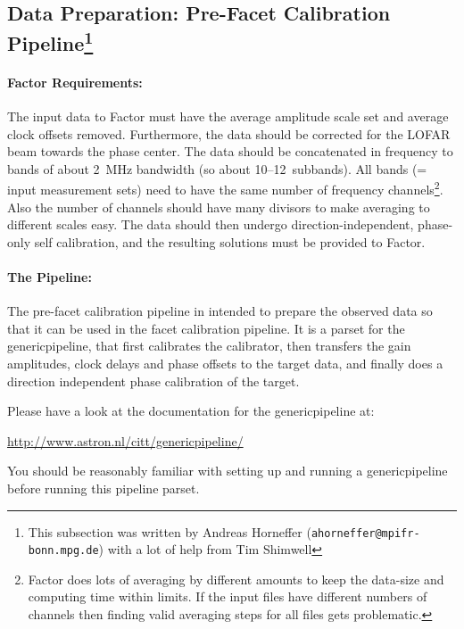 \subsection[Data Preparation: Pre-Facet Calibration Pipeline]{Data Preparation: Pre-Facet Calibration Pipeline\footnote{This 
subsection was written by Andreas Horneffer ({\tt ahorneffer@mpifr-bonn.mpg.de}) with a lot of help from Tim Shimwell}}
\label{pre-facet-pipeline}


\paragraph*{Factor Requirements:}

The input data to Factor must have the average amplitude scale set and average clock
offsets removed. Furthermore, the data should be corrected for the LOFAR beam towards the 
phase center.
The data should be concatenated in frequency to bands of about 2~MHz bandwidth (so about 
10--12~subbands). All bands (= input measurement sets) need to have the same number of
frequency channels\footnote{Factor does lots of averaging by different amounts to keep 
the data-size and computing time within limits. If the input files have different numbers 
of channels then finding valid averaging steps for all files gets problematic.}. Also the 
number of channels should have many divisors to make averaging to different scales easy.
The data should then undergo direction-independent, phase-only self
calibration, and the resulting solutions must be provided to Factor. 


\paragraph*{The Pipeline:}

The pre-facet calibration pipeline in intended to prepare the observed data so that it can be used 
in the facet calibration pipeline. It is a parset for the genericpipeline, that first calibrates the 
calibrator, then transfers the gain amplitudes, 
clock delays and phase offsets to the target data, and finally does a direction independent phase 
calibration of the target.

Please have a look at the documentation for the genericpipeline at: 
\begin{center}
\url{http://www.astron.nl/citt/genericpipeline/}
\end{center}
You should be reasonably familiar with setting up and running a genericpipeline before running this pipeline parset.

